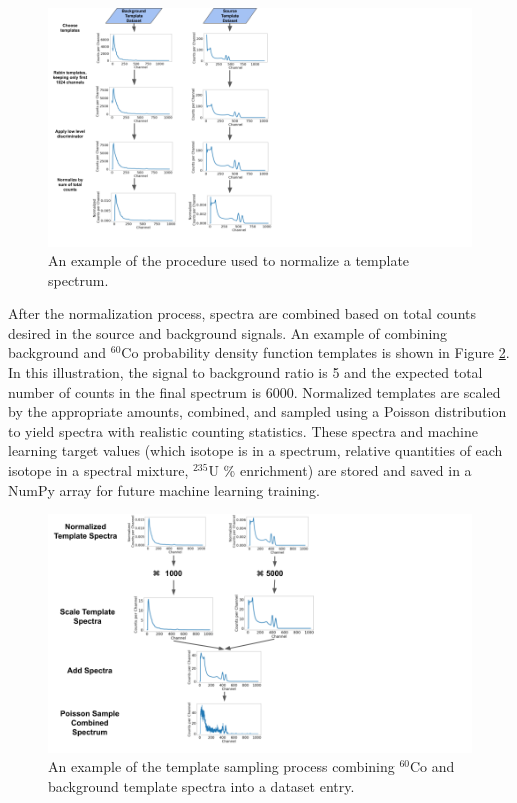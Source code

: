\begin{figure}[H]
	\centering
	\includegraphics[trim=0 0 450 0,clip,width=1.0\linewidth]{images/template_manipulation.png}
	\caption{An example of the procedure used to normalize a template spectrum.}
	\label{fig:template_manipulation}
\end{figure}

After the normalization process, spectra are combined based on total counts desired in the source and background signals. An example of combining background and $^{60}$Co probability density function templates is shown in Figure \ref{fig:template_sampling_diagram}. In this illustration, the signal to background ratio is 5 and the expected total number of counts in the final spectrum is 6000. Normalized templates are scaled by the appropriate amounts, combined, and sampled using a Poisson distribution to yield spectra with realistic counting statistics. These spectra and machine learning target values (which isotope is in a spectrum, relative quantities of each isotope in a spectral mixture, $^{235}$U \% enrichment) are stored and saved in a NumPy array for future machine learning training.

\begin{figure}[!t]
	\centering
	\includegraphics[trim=0 0 350 0,clip,width=1.0\linewidth]{images/template_sampling_diagram.png}
	\caption{An example of the template sampling process combining $^{60}$Co and background template spectra into a dataset entry.}
	\label{fig:template_sampling_diagram}
\end{figure}

